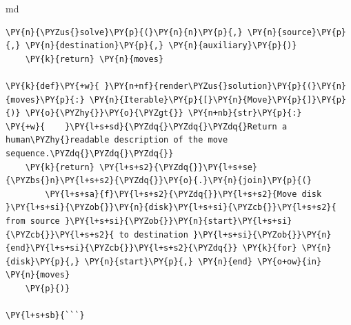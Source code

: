 \documentclass[a4paper,twoside]{article}
\begin{document}
\begin{code}{md}{}{}
\begin{Verbatim}[commandchars=\\\{\},breaklines, breakanywhere, commandchars=\\\{\}]
    \PY{n}{\PYZus{}solve}\PY{p}{(}\PY{n}{n}\PY{p}{,} \PY{n}{source}\PY{p}{,} \PY{n}{destination}\PY{p}{,} \PY{n}{auxiliary}\PY{p}{)}
    \PY{k}{return} \PY{n}{moves}

\PY{k}{def}\PY{+w}{ }\PY{n+nf}{render\PYZus{}solution}\PY{p}{(}\PY{n}{moves}\PY{p}{:} \PY{n}{Iterable}\PY{p}{[}\PY{n}{Move}\PY{p}{]}\PY{p}{)} \PY{o}{\PYZhy{}}\PY{o}{\PYZgt{}} \PY{n+nb}{str}\PY{p}{:}
\PY{+w}{    }\PY{l+s+sd}{\PYZdq{}\PYZdq{}\PYZdq{}Return a human\PYZhy{}readable description of the move sequence.\PYZdq{}\PYZdq{}\PYZdq{}}
    \PY{k}{return} \PY{l+s+s2}{\PYZdq{}}\PY{l+s+se}{\PYZbs{}n}\PY{l+s+s2}{\PYZdq{}}\PY{o}{.}\PY{n}{join}\PY{p}{(}
        \PY{l+s+sa}{f}\PY{l+s+s2}{\PYZdq{}}\PY{l+s+s2}{Move disk }\PY{l+s+si}{\PYZob{}}\PY{n}{disk}\PY{l+s+si}{\PYZcb{}}\PY{l+s+s2}{ from source }\PY{l+s+si}{\PYZob{}}\PY{n}{start}\PY{l+s+si}{\PYZcb{}}\PY{l+s+s2}{ to destination }\PY{l+s+si}{\PYZob{}}\PY{n}{end}\PY{l+s+si}{\PYZcb{}}\PY{l+s+s2}{\PYZdq{}} \PY{k}{for} \PY{n}{disk}\PY{p}{,} \PY{n}{start}\PY{p}{,} \PY{n}{end} \PY{o+ow}{in} \PY{n}{moves}
    \PY{p}{)}

\PY{l+s+sb}{```}
\end{Verbatim}
\end{code}
\end{document}
